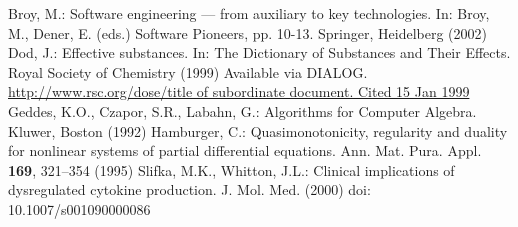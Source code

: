\documentclass[graybox]{svmult}
\begin{document}
\begin{thebibliography}{99.}%
%
%
 Broy, M.: Software engineering --- from auxiliary to key technologies. In: Broy, M., Dener, E. (eds.) Software Pioneers, pp. 10-13. Springer, Heidelberg (2002)
%
 Dod, J.: Effective substances. In: The Dictionary of Substances and Their Effects. Royal Society of Chemistry (1999) Available via DIALOG. \\
\url{http://www.rsc.org/dose/title of subordinate document. Cited 15 Jan 1999}
%
 Geddes, K.O., Czapor, S.R., Labahn, G.: Algorithms for Computer Algebra. Kluwer, Boston (1992) 
%
 Hamburger, C.: Quasimonotonicity, regularity and duality for nonlinear systems of partial differential equations. Ann. Mat. Pura. Appl. \textbf{169}, 321--354 (1995)
%
 Slifka, M.K., Whitton, J.L.: Clinical implications of dysregulated cytokine production. J. Mol. Med. (2000) doi: 10.1007/s001090000086 
%
\end{thebibliography}
\end{document}
